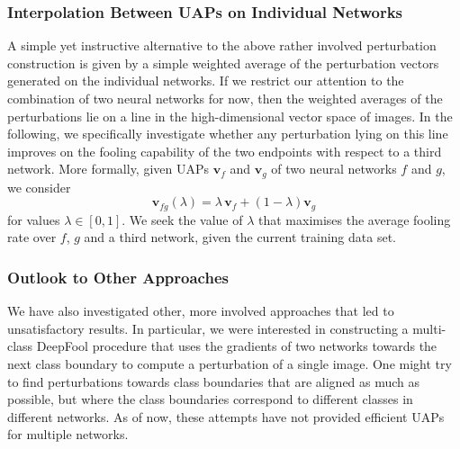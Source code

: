 \documentclass[runningheads]{llncs}
\begin{document}
\subsubsection{Interpolation Between UAPs on Individual Networks}
A simple yet instructive alternative to the above rather involved perturbation construction is given by a simple weighted average of the perturbation vectors generated on the individual networks. If we restrict our attention to the combination of two neural networks for now, then the weighted averages of the perturbations lie on a line in the high-dimensional vector space of images. In the following, we specifically investigate whether any perturbation lying on this line improves on the fooling capability of the two endpoints with respect to a third network.
More formally, given UAPs \(\mathbf{v}_f\) and \(\mathbf{v}_g\) of two neural networks $f$ and $g$, we consider \begin{equation}\label{eq:interp}
\mathbf{v}_{fg}\left(\lambda\right)=\lambda\,\mathbf{v}_f+\left(1-\lambda\right)\mathbf{v}_g
\end{equation}	
for values \(\lambda\in\left[0,1\right]\). We seek the value of $\lambda$ that maximises the average fooling rate over $f$, $g$ and a third network, given the current training data set.


\subsubsection{Outlook to Other Approaches}
We have also investigated other, more involved approaches that led to unsatisfactory results. In particular, we were interested in constructing a multi-class DeepFool procedure that uses the gradients of two networks towards the next class boundary to compute a perturbation of a single image. One might try to find perturbations towards class boundaries that are aligned as much as possible, but where the class boundaries correspond to different classes in different networks. As of now, these attempts have not provided efficient UAPs for multiple networks.
\end{document}
